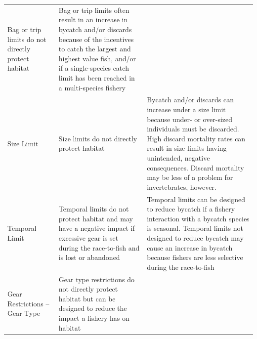 \documentclass[]{book}
\begin{document}
\begin{longtable}[]{@{}lll@{}}
\begin{minipage}[t]{0.30\columnwidth}
Bag or trip limits do not directly protect habitat\strut
\end{minipage} & \begin{minipage}[t]{0.30\columnwidth}\raggedright\strut
Bag or trip limits often result in an increase in bycatch and/or
discards because of the incentives to catch the largest and highest
value fish, and/or if a single-species catch limit has been reached in a
multi-species fishery\strut
\end{minipage}\tabularnewline
\begin{minipage}[t]{0.30\columnwidth}\raggedright\strut
Size Limit\strut
\end{minipage} & \begin{minipage}[t]{0.30\columnwidth}\raggedright\strut
Size limits do not directly protect habitat\strut
\end{minipage} & \begin{minipage}[t]{0.30\columnwidth}\raggedright\strut
Bycatch and/or discards can increase under a size limit because under-
or over-sized individuals must be discarded. High discard mortality
rates can result in size-limits having unintended, negative
consequences. Discard mortality may be less of a problem for
invertebrates, however.\strut
\end{minipage}\tabularnewline
\begin{minipage}[t]{0.30\columnwidth}\raggedright\strut
Temporal Limit\strut
\end{minipage} & \begin{minipage}[t]{0.30\columnwidth}\raggedright\strut
Temporal limits do not protect habitat and may have a negative impact if
excessive gear is set during the race-to-fish and is lost or
abandoned\strut
\end{minipage} & \begin{minipage}[t]{0.30\columnwidth}\raggedright\strut
Temporal limits can be designed to reduce bycatch if a fishery
interaction with a bycatch species is seasonal. Temporal limits not
designed to reduce bycatch may cause an increase in bycatch because
fishers are less selective during the race-to-fish\strut
\end{minipage}\tabularnewline
\begin{minipage}[t]{0.30\columnwidth}\raggedright\strut
Gear Restrictions -- Gear Type\strut
\end{minipage} & \begin{minipage}[t]{0.30\columnwidth}\raggedright\strut
Gear type restrictions do not directly protect habitat but can be
designed to reduce the impact a fishery has on habitat\strut

\end{minipage}
\end{longtable}
\end{document}
